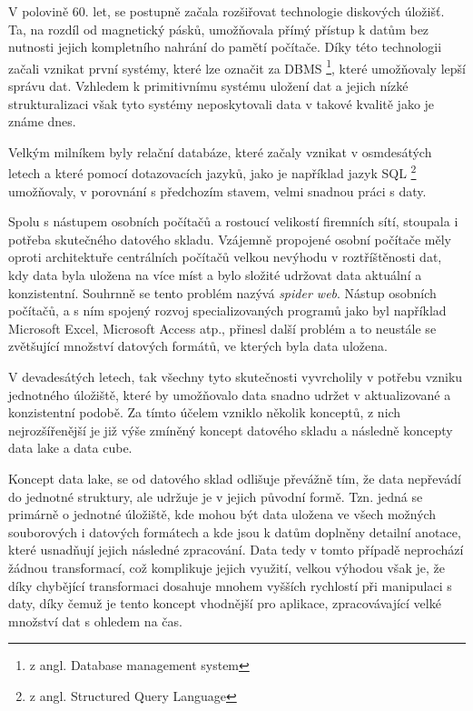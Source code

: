 \documentclass[
  digital,     %
  twoside,     %
  lof,         %
  lot,         %
]{fithesis4}
\begin{document}
V polovině 60. let, se postupně začala rozšiřovat technologie diskových úložišť. Ta,
na rozdíl od magnetický pásků, umožňovala přímý přístup k datům bez nutnosti jejich
kompletního nahrání do pamětí počítače. Díky této technologii začali vznikat první systémy,
které lze označit za DBMS \footnote{z angl. Database management system}, které umožňovaly lepší
správu dat.\parencite{Foote19042018} Vzhledem k primitivnímu systému uložení dat a jejich nízké strukturalizaci 
však tyto systémy neposkytovali data v takové kvalitě jako je známe dnes.

Velkým milníkem byly relační databáze, které začaly vznikat v osmdesátých letech
a které pomocí dotazovacích jazyků, jako je například jazyk SQL \footnote{z angl. Structured Query
Language} umožňovaly, v porovnání s předchozím stavem, velmi snadnou práci s daty.\parencite{Foote19042018}

Spolu s nástupem osobních počítačů a rostoucí velikostí firemních sítí, stoupala i
potřeba skutečného datového skladu. Vzájemně propojené osobní počítače měly oproti
architektuře centrálních počítačů velkou nevýhodu v roztříštěnosti dat, kdy data byla uložena
na více míst a bylo složité udržovat data aktuální a konzistentní. Souhrnně se
tento problém nazývá \emph{spider web}. \parencite[s.~6]{Inmon2005} Nástup osobních počítačů, a s 
ním spojený rozvoj specializovaných programů jako byl například Microsoft Excel, Microsoft Access atp., 
přinesl další problém a to neustále se zvětšující množství datových formátů, ve kterých byla data uložena.\parencite{Foote19042018}

V devadesátých letech, tak všechny tyto skutečnosti vyvrcholily v potřebu vzniku
jednotného úložiště, které by umožňovalo data snadno udržet v aktualizované a konzistentní
podobě. Za tímto účelem vzniklo několik konceptů, z nich nejrozšířenější je již výše zmíněný koncept
datového skladu a následně koncepty data lake a data cube.

Koncept data lake, se od datového sklad odlišuje převážně tím, že data
nepřevádí do jednotné struktury, ale udržuje je v jejich původní formě. Tzn. jedná se
primárně o jednotné úložiště, kde mohou být data uložena ve všech možných souborových
i datových formátech a kde jsou k datům doplněny detailní anotace, které usnadňují jejich následné zpracování.\parencite{Foote19042018}
Data tedy v tomto případě neprochází žádnou transformací, což komplikuje jejich využití, velkou výhodou však je, že  díky chybějící 
transformaci dosahuje mnohem vyšších rychlostí při manipulaci s daty, díky čemuž je tento koncept vhodnější pro aplikace,
zpracovávající velké množství dat s ohledem na čas.\parencite[s.~1]{Harby20221217}
\end{document}
